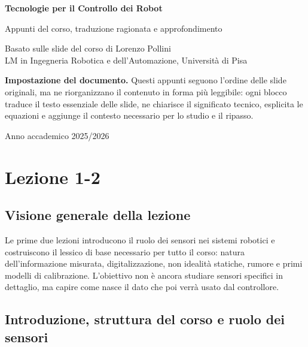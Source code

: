 \documentclass[11pt,a4paper]{article}
\begin{document}
\hypersetup{pageanchor=false}
\begin{titlepage}
\centering
\vspace*{2cm}
{\Huge\bfseries Tecnologie per il Controllo dei Robot \par}
\vspace{0.4cm}
{\LARGE Appunti del corso, traduzione ragionata e approfondimento\par}
\vspace{1cm}
{\large Basato sulle slide del corso di Lorenzo Pollini\\
LM in Ingegneria Robotica e dell'Automazione, Università di Pisa\par}
\vfill
\begin{infobox}
\textbf{Impostazione del documento.} Questi appunti seguono l’ordine delle slide originali, ma ne riorganizzano il contenuto in forma più leggibile: ogni blocco traduce il testo essenziale delle slide, ne chiarisce il significato tecnico, esplicita le equazioni e aggiunge il contesto necessario per lo studio e il ripasso.
\end{infobox}
\vfill
{\large Anno accademico 2025/2026\par}
\end{titlepage}
\hypersetup{pageanchor=true}

\tableofcontents
\clearpage


\section{Lezione 1-2}

\subsection*{Visione generale della lezione}
Le prime due lezioni introducono il ruolo dei sensori nei sistemi robotici e costruiscono il lessico di base necessario per tutto il corso: natura dell’informazione misurata, digitalizzazione, non idealità statiche, rumore e primi modelli di calibrazione. L’obiettivo non è ancora studiare sensori specifici in dettaglio, ma capire come nasce il dato che poi verrà usato dal controllore.

\subsection{Introduzione, struttura del corso e ruolo dei sensori}
\end{document}
